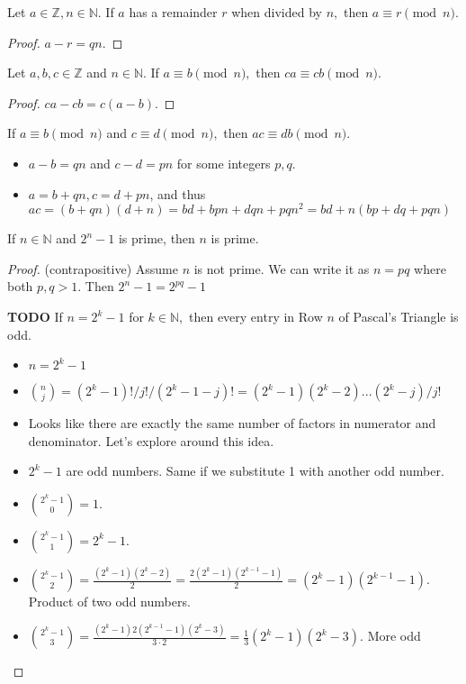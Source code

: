 \documentclass[11pt, oneside]{amsart}
\begin{document}
\begin{enumerate}
\item Let \(a \in \mathbb{Z}, n \in \mathbb{N}.\) If \(a\) has a remainder \(r\) when divided by \(n,\) then \(a \equiv r \pmod{n}.\)
\label{sec:org543eff4}
\begin{proof} $a-r=qn$. \end{proof}
\item Let \(a, b, c \in \mathbb{Z}\) and \(n \in \mathbb{N}.\)  If \(a \equiv b \pmod{n},\)  then \(ca \equiv cb \pmod{n}.\)
\label{sec:orgefb18de}
\begin{proof} $ca-cb=c(a-b)$. \end{proof}
\item If \(a \equiv b \pmod{n}\) and \(c \equiv d \pmod{n},\) then \(ac \equiv db \pmod{n}.\)
\label{sec:org6fc9128}
\begin{itemize}
\item \(a-b=qn\) and \(c-d=pn\) for some integers \(p,q\).
\item \(a=b+qn, c=d+pn\), and thus \(ac = (b+qn)(d+n) = bd + bpn + dqn + pqn^2 = bd + n(bp+dq+pqn)\)
\end{itemize}
\item If \(n \in \mathbb{N}\) and \(2^n - 1\) is prime, then \(n\) is prime.
\label{sec:org582459c}
\begin{proof} (contrapositive) Assume \(n\) is not prime.  We can write it as \(n=pq\) where both \(p,q>1\).  Then \(2^n-1 = 2^{pq}-1\)
\item {\bfseries\sffamily TODO} If \(n = 2^k -1\) for \(k \in \mathbb{N},\) then every entry in Row \(n\) of Pascal's Triangle is odd.
\label{sec:org9107eb9}
\begin{itemize}
\item \(n=2^k-1\)
\item \(\binom{n}{j} = (2^k-1)!/j!/(2^k-1-j)! = (2^k-1)(2^k-2)...(2^k-j)/j!\)
\item Looks like there are exactly the same number of factors in numerator and denominator.  Let's explore around this idea.
\item \(2^k-1\) are odd numbers.  Same if we substitute 1 with another odd number.
\item \(\binom{2^k-1}{0}=1.\)
\item \(\binom{2^k-1}{1} = 2^k-1.\)
\item \(\binom{2^k-1}{2} = \frac{ (2^k-1)(2^k-2) }{ 2 } = \frac{ 2(2^k-1)(2^{k-1}-1) }{2} = (2^k-1)(2^{k-1}-1).\)
Product of two odd numbers.
\item \(\binom{2^k-1}{3} = \frac{ (2^k-1)2(2^{k-1}-1)(2^k-3) }{3\cdot 2} = \tfrac{1}{3}(2^k-1)(2^k-3).\) More odd

\end{itemize}
\end{proof}
\end{enumerate}
\end{document}
